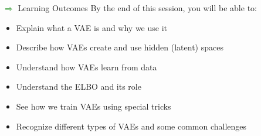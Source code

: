 \begin{frame}[allowframebreaks]{\textcolor{green}{$\Rightarrow$} Learning Outcomes}
    By the end of this session, you will be able to:
    \begin{itemize}
        \item Explain what a VAE is and why we use it
        \item Describe how VAEs create and use hidden (latent) spaces
        \item Understand how VAEs learn from data
        \item Understand the ELBO and its role
        \item See how we train VAEs using special tricks
        \item Recognize different types of VAEs and some common challenges
    \end{itemize}
\end{frame}
